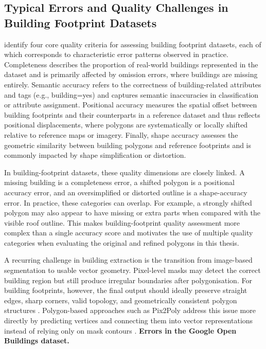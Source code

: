\subsection{Typical Errors and Quality Challenges in Building Footprint Datasets}
\label{sec:building_errors}

\citet{Hongchao_QualityAssesmentOSM} identify four core quality criteria for assessing building footprint datasets, each of which corresponds to characteristic error patterns observed in practice. Completeness describes the proportion of real-world buildings represented in the dataset and is primarily affected by omission errors, where buildings are missing entirely. Semantic accuracy refers to the correctness of building-related attributes and tags (e.g., building=yes) and captures semantic inaccuracies in classification or attribute assignment. Positional accuracy measures the spatial offset between building footprints and their counterparts in a reference dataset and thus reflects positional displacements, where polygons are systematically or locally shifted relative to reference maps or imagery. Finally, shape accuracy assesses the geometric similarity between building polygons and reference footprints and is commonly impacted by shape simplification or distortion.

In building-footprint datasets, these quality dimensions are closely linked. A missing building is a completeness error, a shifted polygon is a positional accuracy error, and an oversimplified or distorted outline is a shape-accuracy error. In practice, these categories can overlap. For example, a strongly shifted polygon may also appear to have missing or extra parts when compared with the visible roof outline. This makes building-footprint quality assessment more complex than a single accuracy score and motivates the use of multiple quality categories when evaluating the original and refined polygons in this thesis.

A recurring challenge in building extraction is the transition from image-based segmentation to usable vector geometry. Pixel-level masks may detect the correct building region but still produce irregular boundaries after polygonisation. For building footprints, however, the final output should ideally preserve straight edges, sharp corners, valid topology, and geometrically consistent polygon structures \citep{girard2021polygonalbuildingsegmentationframe}. Polygon-based approaches such as Pix2Poly address this issue more directly by predicting vertices and connecting them into vector representations instead of relying only on mask contours \citep{pix2poly}.
\textbf{Errors in the Google Open Buildings dataset.}

